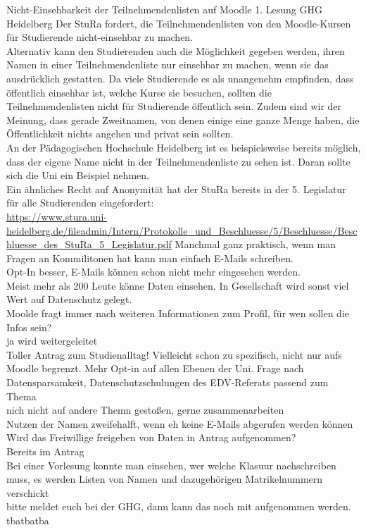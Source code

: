 \antrag
{
Nicht-Einsehbarkeit der Teilnehmendenlisten auf Moodle
}{
    1. Lesung
}{
    GHG Heidelberg
}{
    Der StuRa fordert, die Teilnehmendenlisten von den Moodle-Kursen für Studierende nicht-einsehbar zu
    machen.\\
    Alternativ kann den Studierenden auch die Möglichkeit gegeben werden, ihren Namen in einer
    Teilnehmendenliste nur einsehbar zu machen, wenn sie das ausdrücklich gestatten.
}{
    Da viele Studierende es als unangenehm empfinden, dass öffentlich einsehbar ist, welche Kurse sie
    besuchen, sollten die Teilnehmendenlisten nicht für Studierende öffentlich sein. Zudem sind wir der
    Meinung, dass gerade Zweitnamen, von denen einige eine ganze Menge haben, die Öffentlichkeit nichts
    angehen und privat sein sollten.\\
    An der Pädagogischen Hochschule Heidelberg ist es beispielsweise bereits möglich, dass der eigene
    Name nicht in der Teilnehmendenliste zu sehen ist. Daran sollte sich die Uni ein Beispiel nehmen.\\
    Ein ähnliches Recht auf Anonymität hat der StuRa bereits in der 5. Legislatur für alle Studierenden
    eingefordert:\\
    \url{https://www.stura.uni-heidelberg.de/fileadmin/Intern/Protokolle_und_Beschluesse/5/Beschluesse/Beschluesse_des_StuRa_5_Legislatur.pdf}
}{
    Manchmal ganz praktisch, wenn man Fragen an Kommilitonen hat kann man einfach E-Mails schreiben.\\
        Opt-In besser, E-Mails können schon nicht mehr eingesehen werden.\\
    Meist mehr als 200 Leute könne Daten einsehen. In Gesellschaft wird sonst viel Wert auf Datenschutz gelegt.\\
    Moolde fragt immer nach weiteren Informationen zum Profil, für wen sollen die Infos sein?\\
        ja wird weitergeleitet\\
    Toller Antrag zum  Studienalltag! Vielleicht schon zu spezifisch, nicht nur aufs Moodle begrenzt. Mehr Opt-in auf allen Ebenen der Uni. Frage nach Datensparsamkeit, Datenschutzschulungen des EDV-Referats passend zum Thema\\
        nich nicht auf andere Themn gestoßen, gerne zusammenarbeiten\\
    Nutzen der Namen zweifehalft, wenn eh keine E-Mails abgerufen werden können\\
    Wird das Freiwillige freigeben von Daten in Antrag aufgenommen?\\
        Bereits im Antrag\\
    Bei einer Vorlesung konnte man einsehen, wer welche Klasuur nachschreiben muss, es werden Listen von Namen und dazugehörigen Matrikelnummern verschickt\\
        bitte meldet euch bei der GHG, dann kann das noch mit aufgenommen werden.\\
}{tba}{tba}{tba}
